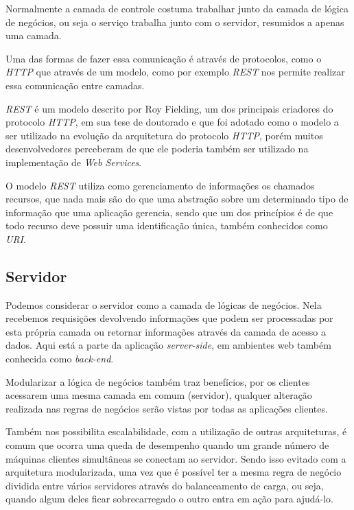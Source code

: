 \documentclass[
	12pt,				%
	openright,			%
	twoside,			%
	a4paper,			%
	english,			%
	brazil				%
	]{abntex2}
\begin{document}
Normalmente a camada de controle costuma trabalhar junto da camada de lógica de negócios, ou seja o serviço trabalha junto com o servidor, resumidos a apenas uma camada.

Uma das formas de fazer essa comunicação é através de protocolos, como o \textit{HTTP} que através de um modelo, como por exemplo \textit{REST} nos permite realizar essa comunicação entre camadas.

\textit{REST} é um modelo descrito por Roy Fielding, um dos principais criadores do protocolo \textit{HTTP}, em sua tese de doutorado e que foi adotado como o modelo a ser utilizado na evolução da arquitetura do protocolo \textit{HTTP}, porém muitos desenvolvedores perceberam de que ele poderia também ser utilizado na implementação de \textit{Web Services}.

O modelo \textit{REST} utiliza como gerenciamento de informações os chamados recursos, que nada mais são do que uma abstração sobre um determinado tipo de informação que uma aplicação gerencia, sendo que um dos princípios é de que todo recurso deve possuir uma identificação única, também conhecidos como \textit{URI}.

\subsection{Servidor}
\label{subsec:Servidor}

Podemos considerar o servidor como a camada de lógicas de negócios. Nela recebemos requisições devolvendo informações que podem ser processadas por esta própria camada ou retornar informações através da camada de acesso a dados. Aqui está a parte da aplicação \textit{server-side}, em ambientes web também conhecida como \textit{back-end}.

Modularizar a lógica de negócios também traz benefícios, por os clientes acessarem uma mesma camada em comum (servidor), qualquer alteração realizada nas regras de negócios serão vistas por todas as aplicações clientes.

Também nos possibilita escalabilidade, com a utilização de outras arquiteturas, é comum que ocorra uma queda de desempenho quando um grande número de máquinas clientes simultâneas se conectam ao servidor. Sendo isso evitado com a arquitetura modularizada, uma vez que é possível ter a mesma regra de negócio dividida entre vários servidores através do balanceamento de carga, ou seja, quando algum deles ficar sobrecarregado o outro entra em ação para ajudá-lo. 
\end{document}
